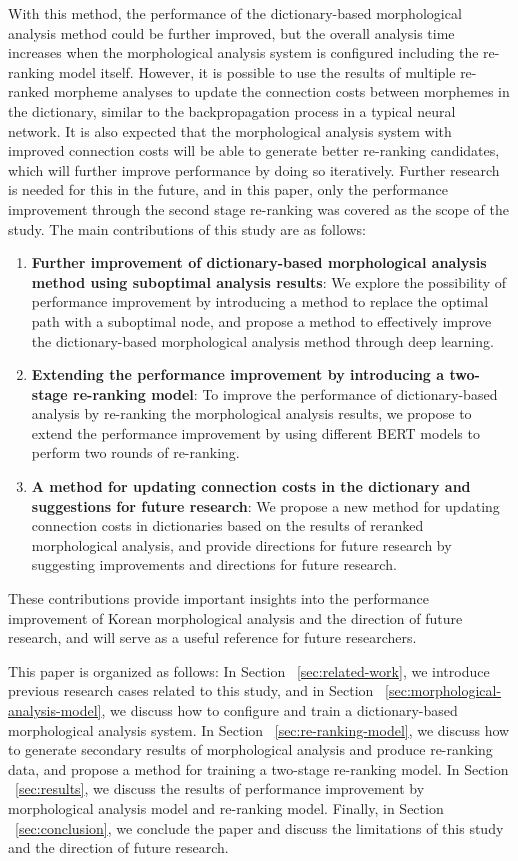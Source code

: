 \documentclass[AMS,STIX2COL]{WileyNJD-v2}
\begin{document}
    With this method, the performance of the dictionary-based morphological analysis method could be further improved, but the overall analysis time increases when the morphological analysis system is configured including the re-ranking model itself.
    However, it is possible to use the results of multiple re-ranked morpheme analyses to update the connection costs between morphemes in the dictionary, similar to the backpropagation process in a typical neural network.
    It is also expected that the morphological analysis system with improved connection costs will be able to generate better re-ranking candidates, which will further improve performance by doing so iteratively.
    Further research is needed for this in the future, and in this paper, only the performance improvement through the second stage re-ranking was covered as the scope of the study.
    The main contributions of this study are as follows:
    \begin{enumerate}
        \item \textbf{Further improvement of dictionary-based morphological analysis method using suboptimal analysis results}: We explore the possibility of performance improvement by introducing a method to replace the optimal path with a suboptimal node, and propose a method to effectively improve the dictionary-based morphological analysis method through deep learning.
        \item \textbf{Extending the performance improvement by introducing a two-stage re-ranking model}: To improve the performance of dictionary-based analysis by re-ranking the morphological analysis results, we propose to extend the performance improvement by using different BERT models to perform two rounds of re-ranking.
        \item \textbf{A method for updating connection costs in the dictionary and suggestions for future research}: We propose a new method for updating connection costs in dictionaries based on the results of reranked morphological analysis, and provide directions for future research by suggesting improvements and directions for future research.
    \end{enumerate}
    These contributions provide important insights into the performance improvement of Korean morphological analysis and the direction of future research, and will serve as a useful reference for future researchers.

    This paper is organized as follows:
    In Section ~\ref{sec:related-work}, we introduce previous research cases related to this study, and in Section ~\ref{sec:morphological-analysis-model}, we discuss how to configure and train a dictionary-based morphological analysis system.
    In Section ~\ref{sec:re-ranking-model}, we discuss how to generate secondary results of morphological analysis and produce re-ranking data, and propose a method for training a two-stage re-ranking model.
    In Section ~\ref{sec:results}, we discuss the results of performance improvement by morphological analysis model and re-ranking model.
    Finally, in Section ~\ref{sec:conclusion}, we conclude the paper and discuss the limitations of this study and the direction of future research.
\end{document}
